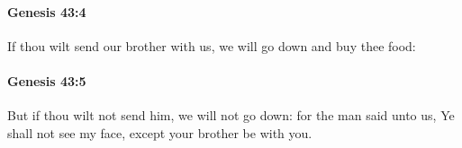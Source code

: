 		\paragraph{Genesis 43:4} %
			\label{GENESIS-43-4}

			If thou wilt send our brother with us, we will go down and buy thee food:


		\paragraph{Genesis 43:5} %
			\label{GENESIS-43-5}

			But if thou wilt not send him, we will not go down: for the man said unto us, Ye shall not see my face, except your brother be with you.


